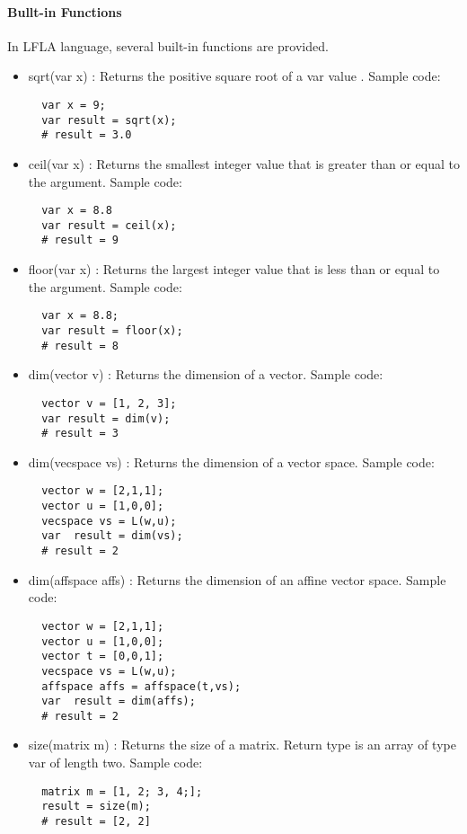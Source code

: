 \documentclass[12pt]{article} %
\begin{document}
 

\paragraph{Bullt-in Functions}
In LFLA language, several built-in functions are provided.
\begin{itemize}
\item sqrt(var x) :
 Returns the positive square root of a var value . Sample code:
\begin{lstlisting}
  var x = 9;
  var result = sqrt(x);
  # result = 3.0
\end{lstlisting}
\item ceil(var x)
: Returns the smallest integer value that is greater than or equal to the argument. Sample code:
\begin{lstlisting}
  var x = 8.8
  var result = ceil(x);
  # result = 9
\end{lstlisting}

\item floor(var x)
: Returns the largest integer value that is less than or equal to the argument. Sample code:
\begin{lstlisting}
  var x = 8.8;
  var result = floor(x);
  # result = 8
\end{lstlisting}

\item dim(vector v)
: Returns the dimension of a vector. Sample code:
\begin{lstlisting}
  vector v = [1, 2, 3];
  var result = dim(v);
  # result = 3
\end{lstlisting}

\item dim(vecspace vs)
: Returns the dimension of a vector space. Sample code:
\begin{lstlisting}
  vector w = [2,1,1];
  vector u = [1,0,0];
  vecspace vs = L(w,u);
  var  result = dim(vs);
  # result = 2
\end{lstlisting}

\item dim(affspace  affs)
: Returns the dimension of an affine vector space. Sample code:
\begin{lstlisting}
  vector w = [2,1,1];
  vector u = [1,0,0];
  vector t = [0,0,1];
  vecspace vs = L(w,u);
  affspace affs = affspace(t,vs);
  var  result = dim(affs);
  # result = 2
\end{lstlisting}

\item size(matrix m)
: Returns the size of a matrix. Return type is an array of type var of length two. Sample code:
\begin{lstlisting}
  matrix m = [1, 2; 3, 4;];
  result = size(m);
  # result = [2, 2]
\end{lstlisting}


\end{itemize}
\end{document}
